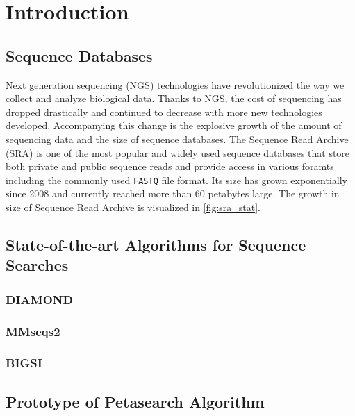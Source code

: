 
\chapter{Introduction}


\section{Sequence Databases}

Next generation sequencing (NGS) technologies have revolutionized the way we collect and analyze biological data. Thanks to NGS, the cost of sequencing has dropped drastically and continued to decrease with more new technologies developed. Accompanying this change is the explosive growth of the amount of sequencing data and the size of sequence databases. The Sequence Read Archive (SRA) is one of the most popular and widely used sequence databases that store both private and public sequence reads and provide access in various foramts including the commonly used \texttt{FASTQ} file format. Its size has grown exponentially since 2008 and currently reached more than 60 petabytes large. The growth in size of Sequence Read Archive is visualized in \ref{fig:sra_stat}.



\section{State-of-the-art Algorithms for Sequence Searches}

\subsection{DIAMOND}

\subsection{MMseqs2}

\subsection{BIGSI}

\section{Prototype of Petasearch Algorithm}

